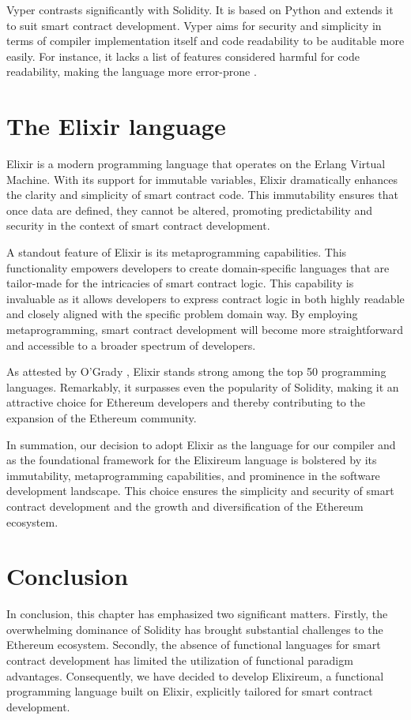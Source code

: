 Vyper contrasts significantly with Solidity. It is based on Python and extends it to suit smart contract development. Vyper aims for security and simplicity in terms of compiler implementation itself and code readability to be auditable more easily. For instance, it lacks a list of features considered harmful for code readability, making the language more error-prone \cite{VyperDescription}.

\section{The Elixir language}
\label{sec:ex}

Elixir \cite{ElixirOfficialWebSite} is a modern programming language that operates on the Erlang Virtual Machine. With its support for immutable variables, Elixir dramatically enhances the clarity and simplicity of smart contract code. This immutability ensures that once data are defined, they cannot be altered, promoting predictability and security in the context of smart contract development.

A standout feature of Elixir is its metaprogramming capabilities. This functionality empowers developers to create domain-specific languages that are tailor-made for the intricacies of smart contract logic. This capability is invaluable as it allows developers to express contract logic in both highly readable and closely aligned with the specific problem domain way. By employing metaprogramming, smart contract development will become more straightforward and accessible to a broader spectrum of developers.

As attested by O'Grady \cite{RedMonk}, Elixir stands strong among the top 50 programming languages. Remarkably, it surpasses even the popularity of Solidity, making it an attractive choice for Ethereum developers and thereby contributing to the expansion of the Ethereum community.

In summation, our decision to adopt Elixir as the language for our compiler and as the foundational framework for the Elixireum language is bolstered by its immutability, metaprogramming capabilities, and prominence in the software development landscape. This choice ensures the simplicity and security of smart contract development and the growth and diversification of the Ethereum ecosystem.

\section{Conclusion}
\label{sec:conc}

In conclusion, this chapter has emphasized two significant matters. Firstly, the overwhelming dominance of Solidity has brought substantial challenges to the Ethereum ecosystem. Secondly, the absence of functional languages for smart contract development has limited the utilization of functional paradigm advantages. Consequently, we have decided to develop Elixireum, a functional programming language built on Elixir, explicitly tailored for smart contract development.

